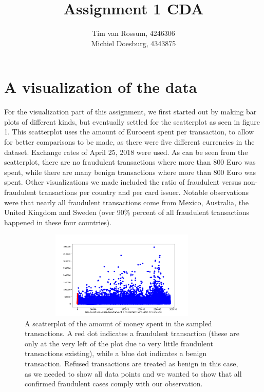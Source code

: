 \documentclass[]{article}
\title{Assignment 1 CDA}
\author{Tim van Rossum, 4246306\\
	Michiel Doesburg, 4343875}
\begin{document}
\maketitle
\section{A visualization of the data}
For the visualization part of this assignment, we first started out by making bar plots of different kinds, but eventually settled  for the scatterplot as seen in figure 1. This scatterplot uses the amount of Eurocent spent per transaction, to allow for better comparisons to be made, as there were five different currencies in the dataset. Exchange rates of April 25, 2018 were used. As can be seen from the scatterplot, there are no fraudulent transactions where more than 800 Euro was spent, while there are many benign transactions where more than 800 Euro was spent. Other visualizations we made included the ratio of fraudulent versus non-fraudulent transactions per country and per card issuer. Notable observations were that nearly all fraudulent transactions come from Mexico, Australia, the United Kingdom and Sweden (over 90\% percent of all fraudulent transactions happened in these four countries).
\begin{figure}[h!]
	\centering
	\includegraphics[width=10cm,height=4.2cm]{Visualizations/AmtFraudvsNonFraud2.png}
	\caption{A scatterplot of the amount of money spent in the sampled transactions. A red dot indicates a fraudulent transaction (these are only at the very left of the plot due to very little fraudulent transactions existing), while a blue dot indicates a benign transaction. Refused transactions are treated as benign in this case, as we needed to show all data points and we wanted to show that all confirmed fraudulent cases comply with our observation.}
\end{figure}
\clearpage
\end{document}
